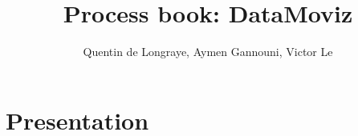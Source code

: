 \documentclass[a4paper,10pt]{article}
\begin{document}
\title{Process book: DataMoviz}
\author{Quentin de Longraye, Aymen Gannouni, Victor Le}

\maketitle

\tableofcontents

\newpage

\section{Presentation}
\end{document}
